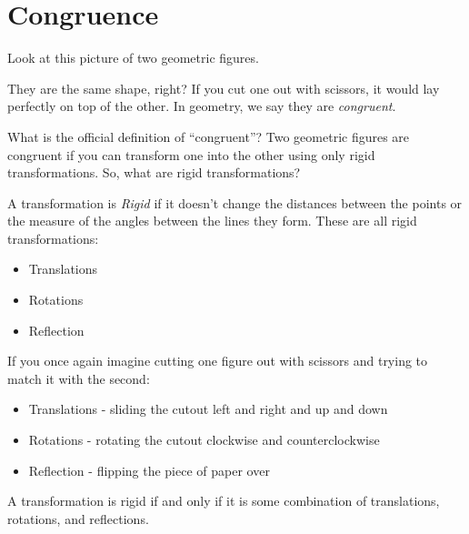 \chapter{Congruence}

Look at this picture of two geometric figures.


They are the same shape, right? If you cut one out with scissors, it
would lay perfectly on top of the other. In geometry, we say they are
\emph{congruent}.

What is the official definition of ``congruent''? Two geometric
figures are congruent if you can transform one into the other using
only rigid transformations.  So, what are rigid transformations?

A transformation is \emph{Rigid} if it doesn't change the distances
between the points or the measure of the angles between the lines they
form. These are all rigid transformations:
\begin{itemize}
\item Translations
\item Rotations
\item Reflection 
\end{itemize}

If you once again imagine cutting one figure out with scissors and trying to match it with the second:
\begin{itemize}
\item Translations - sliding the cutout left and right and up and down
\item Rotations	- rotating the cutout clockwise and counterclockwise
\item Reflection - flipping the piece of paper over
\end{itemize}

A transformation is rigid if and only if it is some combination of translations, rotations, and reflections.

